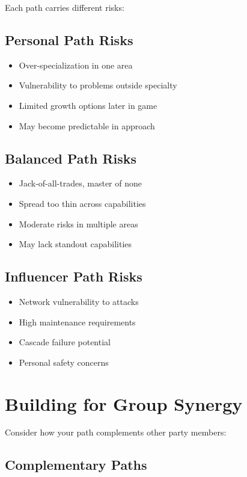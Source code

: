 \documentclass[11pt,twoside,openany]{book}
\begin{document}
Each path carries different risks:

\subsection*{Personal Path Risks}

\begin{itemize}
\item Over-specialization in one area
\item Vulnerability to problems outside specialty
\item Limited growth options later in game
\item May become predictable in approach
\end{itemize}

\subsection*{Balanced Path Risks}

\begin{itemize}
\item Jack-of-all-trades, master of none
\item Spread too thin across capabilities
\item Moderate risks in multiple areas
\item May lack standout capabilities
\end{itemize}

\subsection*{Influencer Path Risks}

\begin{itemize}
\item Network vulnerability to attacks
\item High maintenance requirements
\item Cascade failure potential
\item Personal safety concerns
\end{itemize}

\section*{Building for Group Synergy} 

Consider how your path complements other party members:

\subsection*{Complementary Paths}
\end{document}
